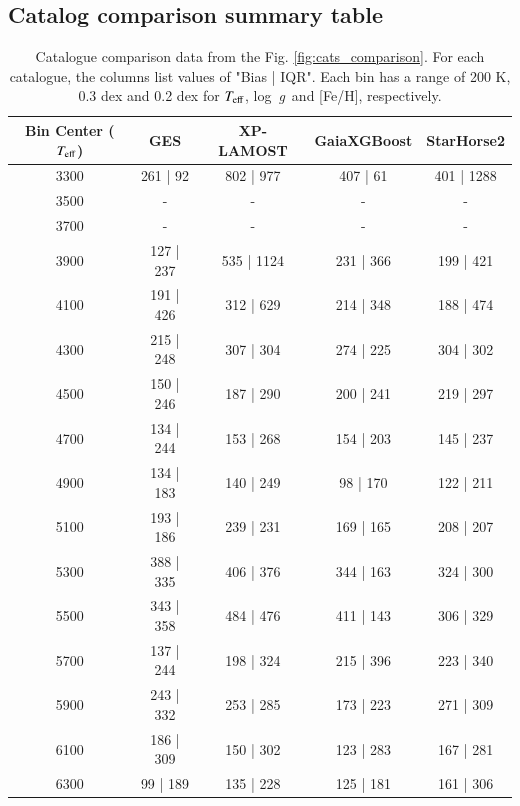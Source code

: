 \documentclass{aa}
\def\teff{$\textit{T}_{\rm{eff}}$}
\def\logg{\mbox{log~{\it g}}}
\begin{document}

 

\begin{appendix}

\onecolumn

\section{Catalog comparison summary table}
\label{app:tab}


\begin{table}[!ht]
    \centering
    \label{tab:cat_comparison}
    \caption{Catalogue comparison data from the Fig. \ref{fig:cats_comparison}. For each catalogue, the columns list values of "Bias | IQR". Each bin has a range of 200 K, 0.3 dex and 0.2 dex for \teff, \logg\ and [Fe/H], respectively.}
    \begin{tabular}{c c c c c}
    \hline\hline
        Bin Center (\teff) & GES & XP-LAMOST & GaiaXGBoost & StarHorse2 \\
    \hline
        3300 & 261 | 92 & 802 | 977 & 407 | 61 & 401 | 1288 \\ 
        3500 & - & - & - & - \\ 
        3700 & - & - & - & - \\ 
        3900 & 127 | 237 & 535 | 1124 & 231 | 366 & 199 | 421 \\ 
        4100 & 191 | 426 & 312 | 629 & 214 | 348 & 188 | 474 \\ 
        4300 & 215 | 248 & 307 | 304 & 274 | 225 & 304 | 302 \\ 
        4500 & 150 | 246 & 187 | 290 & 200 | 241 & 219 | 297 \\ 
        4700 & 134 | 244 & 153 | 268 & 154 | 203 & 145 | 237 \\ 
        4900 & 134 | 183 & 140 | 249 & 98 | 170 & 122 | 211 \\ 
        5100 & 193 | 186 & 239 | 231 & 169 | 165 & 208 | 207 \\
        5300 & 388 | 335 & 406 | 376 & 344 | 163 & 324 | 300 \\
        5500 & 343 | 358 & 484 | 476 & 411 | 143 & 306 | 329 \\
        5700 & 137 | 244 & 198 | 324 & 215 | 396 & 223 | 340 \\
        5900 & 243 | 332 & 253 | 285 & 173 | 223 & 271 | 309 \\
        6100 & 186 | 309 & 150 | 302 & 123 | 283 & 167 | 281 \\
        6300 & 99 | 189 & 135 | 228 & 125 | 181 & 161 | 306 \\ 
    \hline
    \end{tabular}
\end{table}



\end{appendix}
\end{document}
